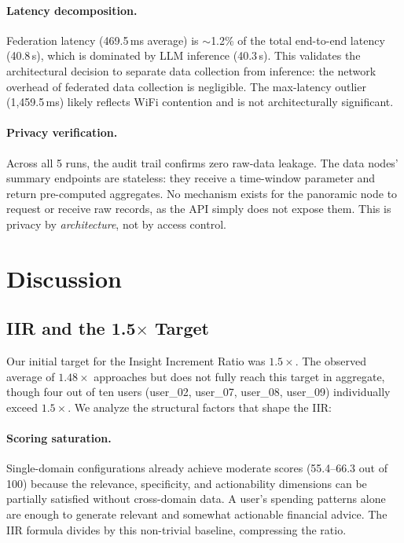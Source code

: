 \documentclass[11pt,a4paper]{article}
\newcommand{\iir}{\textsc{IIR}}
\begin{document}
\paragraph{Latency decomposition.} Federation latency (469.5\,ms average)
is $\sim$1.2\% of the total end-to-end latency (40.8\,s), which is dominated
by LLM inference (40.3\,s). This validates the architectural decision to
separate data collection from inference: the network overhead of federated
data collection is negligible. The max-latency outlier (1,459.5\,ms) likely
reflects WiFi contention and is not architecturally significant.

\paragraph{Privacy verification.} Across all 5 runs, the audit trail confirms
zero raw-data leakage. The data nodes' summary endpoints are stateless: they
receive a time-window parameter and return pre-computed aggregates. No
mechanism exists for the panoramic node to request or receive raw records,
as the API simply does not expose them. This is privacy by \emph{architecture},
not by access control.


\section{Discussion}
\label{sec:discussion}

\subsection{IIR and the 1.5$\times$ Target}

Our initial target for the Insight Increment Ratio was $1.5\times$. The
observed average of $1.48\times$ approaches but does not fully reach this
target in aggregate, though four out of ten users (user\_02, user\_07,
user\_08, user\_09) individually exceed $1.5\times$. We analyze the
structural factors that shape the IIR:

\paragraph{Scoring saturation.} Single-domain configurations already achieve
moderate scores (55.4--66.3 out of 100) because the relevance, specificity,
and actionability dimensions can be partially satisfied without cross-domain
data. A user's spending patterns alone are enough to generate relevant and
somewhat actionable financial advice. The \iir{} formula divides by this
non-trivial baseline, compressing the ratio.
\end{document}
